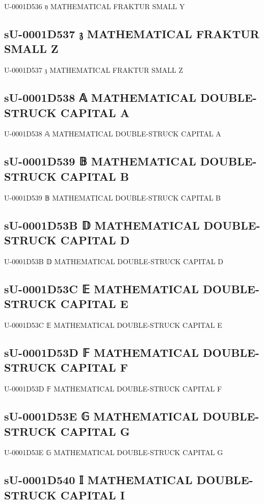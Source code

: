 U-0001D536 𝔶 MATHEMATICAL FRAKTUR SMALL Y

\subsection{sU-0001D537 𝔷 MATHEMATICAL FRAKTUR SMALL Z}

U-0001D537 𝔷 MATHEMATICAL FRAKTUR SMALL Z

\subsection{sU-0001D538 𝔸 MATHEMATICAL DOUBLE-STRUCK CAPITAL A}

U-0001D538 𝔸 MATHEMATICAL DOUBLE-STRUCK CAPITAL A

\subsection{sU-0001D539 𝔹 MATHEMATICAL DOUBLE-STRUCK CAPITAL B}

U-0001D539 𝔹 MATHEMATICAL DOUBLE-STRUCK CAPITAL B

\subsection{sU-0001D53B 𝔻 MATHEMATICAL DOUBLE-STRUCK CAPITAL D}

U-0001D53B 𝔻 MATHEMATICAL DOUBLE-STRUCK CAPITAL D

\subsection{sU-0001D53C 𝔼 MATHEMATICAL DOUBLE-STRUCK CAPITAL E}

U-0001D53C 𝔼 MATHEMATICAL DOUBLE-STRUCK CAPITAL E

\subsection{sU-0001D53D 𝔽 MATHEMATICAL DOUBLE-STRUCK CAPITAL F}

U-0001D53D 𝔽 MATHEMATICAL DOUBLE-STRUCK CAPITAL F

\subsection{sU-0001D53E 𝔾 MATHEMATICAL DOUBLE-STRUCK CAPITAL G}

U-0001D53E 𝔾 MATHEMATICAL DOUBLE-STRUCK CAPITAL G

\subsection{sU-0001D540 𝕀 MATHEMATICAL DOUBLE-STRUCK CAPITAL I}

